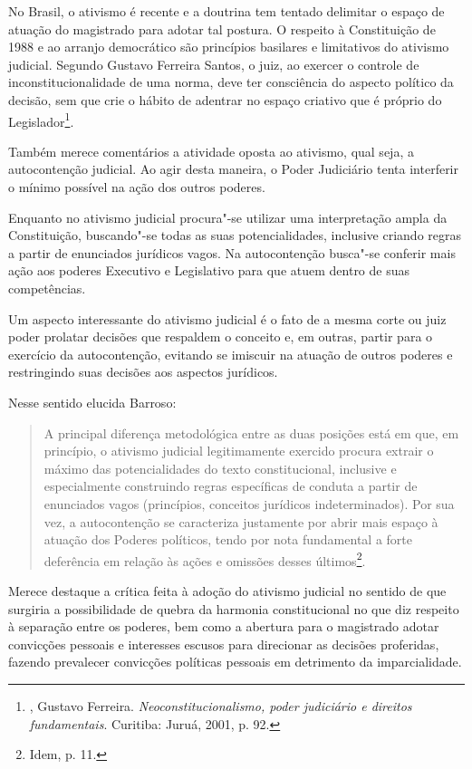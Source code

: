 No Brasil, o ativismo é recente e a doutrina tem tentado
delimitar o espaço de atuação do magistrado para adotar tal postura. O
respeito à Constituição de 1988 e ao arranjo democrático são princípios
basilares e limitativos do ativismo judicial. Segundo Gustavo Ferreira
Santos, o juiz, ao exercer o controle de inconstitucionalidade de
uma norma, deve ter consciência do aspecto político da decisão, sem que
crie o hábito de adentrar no espaço criativo que é próprio do
Legislador\footnote{, Gustavo Ferreira. \emph{Neoconstitucionalismo,
  poder judiciário e direitos fundamentais}. Curitiba: Juruá,
  2001, p. 92.}.

Também merece comentários a atividade oposta ao ativismo, qual seja, a
autocontenção judicial. Ao agir desta maneira, o Poder Judiciário tenta
interferir o mínimo possível na ação dos outros poderes.

Enquanto no ativismo judicial procura"-se utilizar uma interpretação
ampla da Constituição, buscando"-se todas as suas potencialidades,
inclusive criando regras a partir de enunciados jurídicos vagos. Na
autocontenção busca"-se conferir mais ação aos poderes Executivo e
Legislativo para que atuem dentro de suas competências.

Um aspecto interessante do ativismo judicial é o fato de a mesma corte
ou juiz poder prolatar decisões que respaldem o conceito e, em outras,
partir para o exercício da autocontenção, evitando se imiscuir na
atuação de outros poderes e restringindo suas decisões aos aspectos
jurídicos.

Nesse sentido elucida Barroso:

\begin{quote}
A principal diferença metodológica entre as duas posições está em que,
em princípio, o ativismo judicial legitimamente exercido procura extrair
o máximo das potencialidades do texto constitucional, inclusive e
especialmente construindo regras específicas de conduta a partir de
enunciados vagos (princípios, conceitos jurídicos indeterminados). Por
sua vez, a autocontenção se caracteriza justamente por abrir mais espaço
à atuação dos Poderes políticos, tendo por nota fundamental a forte
deferência em relação às ações e omissões desses últimos\footnote{Idem, p. 11.}.
\end{quote}

Merece destaque a crítica feita à adoção do ativismo judicial no sentido
de que surgiria a possibilidade de quebra da harmonia constitucional no
que diz respeito à separação entre os poderes, bem como a abertura para
o magistrado adotar convicções pessoais e interesses escusos para
direcionar as decisões proferidas, fazendo prevalecer convicções
políticas pessoais em detrimento da imparcialidade.


